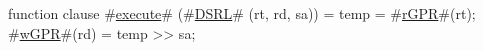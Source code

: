 function clause #\hyperref[zexecute]{execute}# (#\hyperref[zDSRL]{DSRL}# (rt, rd, sa)) =
  {
    temp     = #\hyperref[zrGPR]{rGPR}#(rt);
    #\hyperref[zwGPR]{wGPR}#(rd) = temp >> sa;
  }
